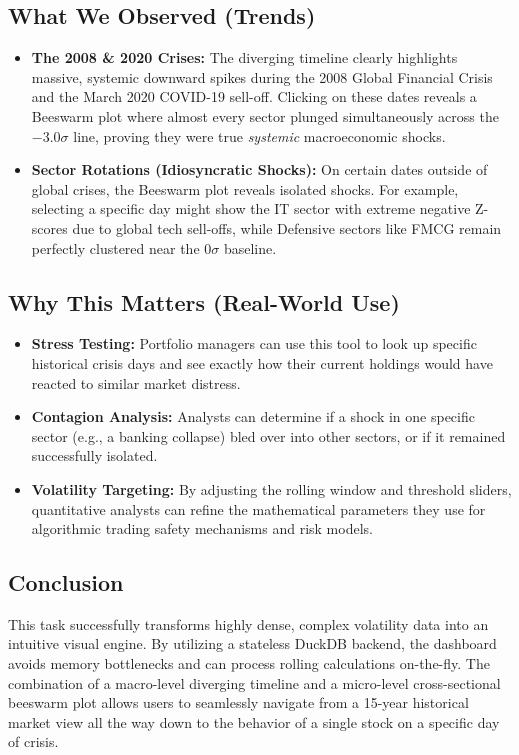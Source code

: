 \documentclass[14pt,a4paper]{extreport}
\begin{document}
\subsection{What We Observed (Trends)}
\begin{itemize}[label=-]
    \item \textbf{The 2008 \& 2020 Crises:} The diverging timeline clearly
        highlights massive, systemic downward spikes during the 2008
        Global Financial Crisis and the March 2020 COVID-19 sell-off.
        Clicking on these dates reveals a Beeswarm plot where almost every
        sector plunged simultaneously across the $-3.0\sigma$ line,
        proving they were true \textit{systemic} macroeconomic shocks.
    \item \textbf{Sector Rotations (Idiosyncratic Shocks):} On certain
        dates outside of global crises, the Beeswarm plot reveals isolated
        shocks. For example, selecting a specific day might show the IT
        sector with extreme negative Z-scores due to global tech
        sell-offs, while Defensive sectors like FMCG remain perfectly
        clustered near the $0\sigma$ baseline.
\end{itemize}

\subsection{Why This Matters (Real-World Use)}
\begin{itemize}[label=-]
    \item \textbf{Stress Testing:} Portfolio managers can use this tool to
        look up specific historical crisis days and see exactly how their
        current holdings would have reacted to similar market distress.
    \item \textbf{Contagion Analysis:} Analysts can determine if a shock
        in one specific sector (e.g., a banking collapse) bled over into
        other sectors, or if it remained successfully isolated.
    \item \textbf{Volatility Targeting:} By adjusting the rolling window
        and threshold sliders, quantitative analysts can refine the
        mathematical parameters they use for algorithmic trading safety
        mechanisms and risk models.
\end{itemize}

\subsection{Conclusion}
This task successfully transforms highly dense, complex volatility data
into an intuitive visual engine. By utilizing a stateless DuckDB backend,
the dashboard avoids memory bottlenecks and can process rolling
calculations on-the-fly. The combination of a macro-level diverging
timeline and a micro-level cross-sectional beeswarm plot allows users to
seamlessly navigate from a 15-year historical market view all the way down
to the behavior of a single stock on a specific day of crisis.
\end{document}
